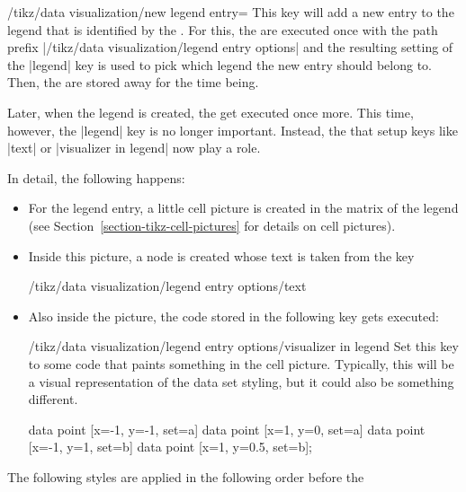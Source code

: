 \begin{key}{/tikz/data visualization/new legend entry=}
  This key will add a new entry to the legend that is identified by
  the . For this, the  are executed once
  with the path prefix |/tikz/data visualization/legend entry options|
  and the resulting setting of the |legend| key is used to pick which
  legend the new entry should belong to. Then, the  are
  stored away for the time being.

  Later, when the legend is created, the  get executed
  once more. This time, however, the |legend| key is no longer
  important. Instead, the  that setup keys like
  |text| or |visualizer in legend| now play a role.

  In detail, the following happens:
  \begin{itemize}
  \item For the legend entry, a little cell picture is created in the
    matrix of the legend (see Section~\ref{section-tikz-cell-pictures}
    for details on cell pictures).
  \item Inside this picture, a node is created whose text is taken
    from the key
\begin{codeexample}
/tikz/data visualization/legend entry options/text      
\end{codeexample}
  \item Also inside the picture, the code stored in the following key
    gets executed:
    \begin{key}{/tikz/data visualization/legend entry options/visualizer in legend}
      Set this key to some code that paints something in the cell
      picture. Typically, this will be a visual representation of the
      data set styling, but it could also be something different.
\begin{codeexample}[width=6cm]
\tikz \datavisualization [
  school book axes, visualize as line/.list={a,b},
  style sheet=vary dashing,
  a={label in legend={text=a}},
  new legend entry={
    text=spacer,
    visualizer in legend={\draw[solid] (0,0) circle[radius=2pt];}
  },
  b={label in legend={text=b}}]
data point [x=-1, y=-1, set=a]   data point [x=1, y=0, set=a]
data point [x=-1, y=1,  set=b]   data point [x=1, y=0.5, set=b];
\end{codeexample}
    \end{key}
  \end{itemize}
  The following styles are applied in the following order before the

\end{key}
